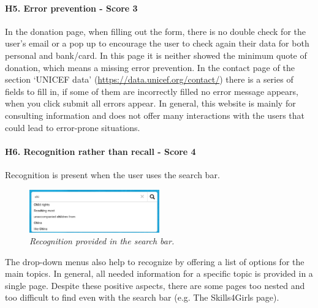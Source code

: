 



\paragraph{H5. Error prevention - Score 3}  \label{subsec:H5}	In the donation page, when filling out the form, there is no double check for the user's email or a pop up to encourage the user to check again their data for both personal and bank/card.
In this page it is neither showed the minimum quote of donation, which means a missing error prevention.
\newline In the contact page of the section ‘UNICEF data’ (\href {https://data.unicef.org/contact/}{https://data.unicef.org/contact/}) there is a series of fields to fill in, if some of them are incorrectly filled no error message appears, when you click submit all errors appear.
\newline In general, this website is mainly for consulting information and does not offer many interactions with the users that could lead to error-prone situations.
\newline
\newline \paragraph{H6. Recognition rather than recall - Score 4}  \label{subsec:H6}	Recognition is present when the user uses the search bar.
\begin{figure}[!h]
	\begin{center}
		\includegraphics[width=0.5\textwidth]{FinalScores12.jpg}
		\captionsetup{font=small}
		\caption{\textit{Recognition provided in the search bar.}}
	\end{center}
\end{figure}
\newline The drop-down menus also help to recognize by offering a list of options for the main topics. 
\newline In general, all needed information for a specific topic is provided in a single page.
\newline Despite these positive aspects, there are some pages too nested and too difficult to find even with the search bar (e.g. The Skills4Girls page).
